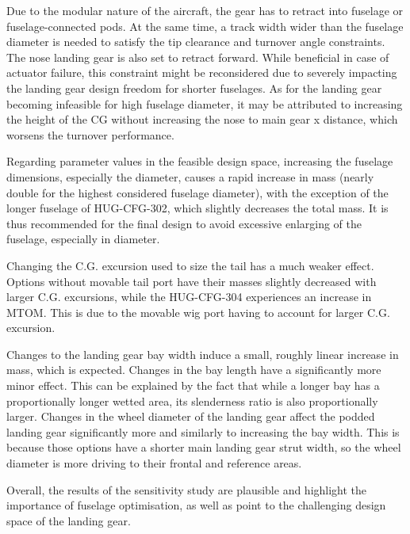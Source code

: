 Due to the modular nature of the aircraft, the gear has to retract into fuselage or fuselage-connected pods. At the same time, a track width wider than the fuselage diameter is needed to satisfy the tip clearance and turnover angle constraints. The nose landing gear is also set to retract forward. While beneficial in case of actuator failure, this constraint might be reconsidered due to severely impacting the landing gear design freedom for shorter fuselages. As for the landing gear becoming infeasible for high fuselage diameter, it may be attributed to increasing the height of the CG without increasing the nose to main gear x distance, which worsens the turnover performance.

Regarding parameter values in the feasible design space, increasing the fuselage dimensions, especially the diameter, causes a rapid increase in mass (nearly double for the highest considered fuselage diameter), with the exception of the longer fuselage of HUG-CFG-302, which slightly decreases the total mass. It is thus recommended for the final design to avoid excessive enlarging of the fuselage, especially in diameter.

Changing the C.G. excursion used to size the tail has a much weaker effect. Options without movable tail port have their masses slightly decreased with larger C.G. excursions, while the HUG-CFG-304 experiences an increase in MTOM. This is due to the movable wig port having to account for larger C.G. excursion.

Changes to the landing gear bay width induce a small, roughly linear increase in mass, which is expected. Changes in the bay length have a significantly more minor effect. This can be explained by the fact that while a longer bay has a proportionally longer wetted area, its slenderness ratio is also proportionally larger. Changes in the wheel diameter of the landing gear affect the podded landing gear significantly more and similarly to increasing the bay width. This is because those options have a shorter main landing gear strut width, so the wheel diameter is more driving to their frontal and reference areas.

Overall, the results of the sensitivity study are plausible and highlight the importance of fuselage optimisation, as well as point to the challenging design space of the landing gear.




